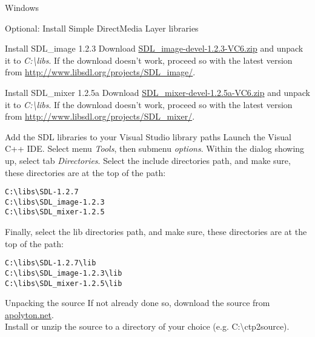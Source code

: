 \begin{section}{Windows}
\begin{subsection}{Optional: Install Simple DirectMedia Layer libraries}
\begin{subsubsection}{Install SDL\_image 1.2.3}
Download \href{http://www.libsdl.org/projects/SDL_image/release/SDL_image-devel-1.2.3-VC6.zip}{SDL\_image-devel-1.2.3-VC6.zip} and unpack it to \textit{C:\textbackslash{}libs}.
If the download doesn't work, proceed so with the latest version from \href{http://www.libsdl.org/projects/SDL_image/}{http://www.libsdl.org/projects/SDL\_image/}.
\end{subsubsection}%

\begin{subsubsection}{Install SDL\_mixer 1.2.5a}
Download \href{http://www.libsdl.org/projects/SDL_mixer/release/SDL_mixer-devel-1.2.5a-VC6.zip}{SDL\_mixer-devel-1.2.5a-VC6.zip} and unpack it to \textit{C:\textbackslash{}libs}.
If the download doesn't work, proceed so with the latest version from \href{http://www.libsdl.org/projects/SDL_mixer/}{http://www.libsdl.org/projects/SDL\_mixer/}.
\end{subsubsection}%

\begin{subsubsection}{Add the SDL libraries to your Visual Studio library paths}
Launch the Visual C++ IDE. Select menu \textit{Tools}, then submenu \textit{options}. Within the dialog showing up, select tab \textit{Directories}. Select the include directories path, and make sure, these directories are at the top of the path:\\
\begin{verbatim}
C:\libs\SDL-1.2.7
C:\libs\SDL_image-1.2.3
C:\libs\SDL_mixer-1.2.5
\end{verbatim}

Finally, select the lib directories path, and make sure, these directories are at the top of the path:\\
\begin{verbatim}
C:\libs\SDL-1.2.7\lib
C:\libs\SDL_image-1.2.3\lib
C:\libs\SDL_mixer-1.2.5\lib
\end{verbatim}
\end{subsubsection}%
\end{subsection}%

\begin{subsection}{Unpacking the source}
If not already done so, download the source from \href{http://ctp2files.apolyton.net/source/}{apolyton.net}.\\
Install or unzip the source to a directory of your choice (e.g. C:\textbackslash{}ctp2source).\\
\end{subsection}%


\end{section}

